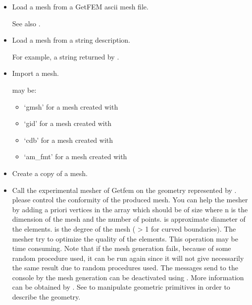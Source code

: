\documentclass[a4paper,11pt,english]{sphinxmanual}
\begin{document}
\begin{fulllineitems}
\begin{itemize}
\item {} 
Load a mesh from a GetFEM ascii mesh file.

See also .

\item {} 
Load a mesh from a string description.

For example, a string returned by .

\item {} 
Import a mesh.

 may be:
\begin{itemize}
\item {} 
‘gmsh’ for a mesh created with 

\item {} 
‘gid’ for a mesh created with 

\item {} 
‘cdb’ for a mesh created with 

\item {} 
‘am\_fmt’ for a mesh created with 

\end{itemize}

\item {} 
Create a copy of a mesh.

\item {} 
Call the experimental mesher of Getfem on the geometry
represented by . please control the conformity of the produced mesh.
You can help the mesher by adding a priori vertices in the array
 which should be of size  where  n is the
dimension of the mesh and  the number of points.  is
approximate diameter of the elements.  is the degree of the
mesh ( \textgreater{} 1 for curved boundaries).  The mesher try to optimize the
quality of the elements. This operation may be time consuming.
Note that if the mesh generation fails, because of some random
procedure used, it can be run again since it will not give necessarily
the same result due to random procedures used.
The messages send to the console by the mesh generation can be
deactivated using . More information
can be obtained by . See 
to manipulate geometric primitives in order to describe the geometry.


\end{itemize}
\end{fulllineitems}
\end{document}
